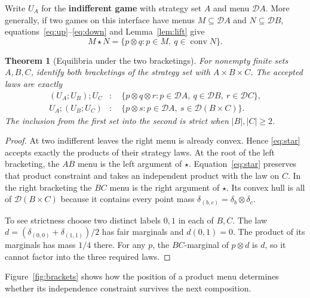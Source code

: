 \documentclass[11pt,a4paper]{article}
\newtheorem{theorem}{Theorem}[section]
\theoremstyle{definition}
\newcommand{\D}{\mathcal D}
\newcommand{\conv}{\operatorname{conv}}
\begin{document}
Write $U_A$ for the \textbf{indifferent game} with strategy set $A$ and menu $\D A$. More generally, if two games on this interface have menus $M\subseteq\D A$ and $N\subseteq\D B$, equations~\eqref{eq:up}--\eqref{eq:down} and Lemma~\ref{lem:lift} give
\begin{equation}
    M\star N=\{p\otimes q:p\in M,\ q\in\conv N\}.
    \label{eq:star}
\end{equation}

\begin{theorem}[Equilibria under the two bracketings]\label{thm:assoc}
    For nonempty finite sets $A,B,C$, identify both bracketings of the strategy set with $A\times B\times C$. The accepted laws are exactly
    \begin{align*}
        (U_A;U_B);U_C &: \quad
        \{p\otimes q\otimes r:p\in\D A,\ q\in\D B,\ r\in\D C\},\\
        U_A;(U_B;U_C) &: \quad
        \{p\otimes s:p\in\D A,\ s\in\D(B\times C)\}.
    \end{align*}
    The inclusion from the first set into the second is strict when $|B|,|C|\ge2$.
\end{theorem}
\begin{proof}
    At two indifferent leaves the right menu is already convex. Hence \eqref{eq:star} accepts exactly the products of their strategy laws. At the root of the left bracketing, the $AB$ menu is the left argument of $\star$. Equation~\eqref{eq:star} preserves that product constraint and takes an independent product with the law on $C$. In the right bracketing the $BC$ menu is the right argument of $\star$. Its convex hull is all of $\D(B\times C)$ because it contains every point mass $\delta_{(b,c)}=\delta_b\otimes\delta_c$.

    To see strictness choose two distinct labels $0,1$ in each of $B,C$. The law $d=(\delta_{(0,0)}+\delta_{(1,1)})/2$ has fair marginals and $d(0,1)=0$. The product of its marginals has mass $1/4$ there. For any $p$, the $BC$-marginal of $p\otimes d$ is $d$, so it cannot factor into the three required laws.
\end{proof}

Figure~\ref{fig:brackets} shows how the position of a product menu determines whether its independence constraint survives the next composition.
\end{document}
